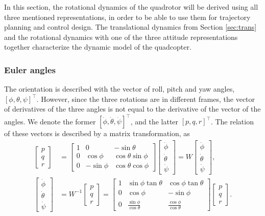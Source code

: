 In this section, the rotational dynamics of the quadrotor will be derived using all three mentioned representations, in order to be able to use them for trajectory planning and control design. The translational dynamics from Section \ref{sec:trans} and the rotational dynamics with one of the three attitude representations together characterize the dynamic model of the quadcopter.





\subsubsection{Euler angles}
The orientation is described with the vector of roll, pitch and yaw angles, $[\phi,\theta,\psi]^\top$. However, since the three rotations are in different frames, the vector of derivatives of the three angles is not equal to the derivative of the vector of the angles. We denote the former $[\dot\phi,\dot\theta,\dot\psi]^\top$, and the latter $[p,q,r]^\top$. The relation of these vectors is described by a matrix transformation, as
\begin{align}
\begin{bmatrix} p\\q\\ r \end{bmatrix} &= \begin{bmatrix}
1 & 0 & -\sin\theta \\ 
0 & \cos\phi & \cos\theta\sin\phi \\ 
0 & -\sin\phi & \cos\theta\cos\phi
\end{bmatrix}\begin{bmatrix}
\dot\phi \\ \dot\theta \\ \dot\psi
\end{bmatrix} = W \begin{bmatrix}
\dot\phi \\ \dot\theta \\ \dot\psi
\end{bmatrix},\\
\begin{bmatrix}
\dot\phi \\ \dot\theta \\ \dot\psi
\end{bmatrix}&= W^{-1}\begin{bmatrix} p\\q\\ r \end{bmatrix} = \begin{bmatrix}
1 & \sin\phi\tan\theta & \cos\phi\tan\theta \\
0 & \cos\phi & -\sin\phi \\
0 & \frac{\sin\phi}{\cos\theta} & \frac{\cos\phi}{\cos\theta}
\end{bmatrix}\begin{bmatrix} p\\q\\ r \end{bmatrix}.\label{eq:angvel}
\end{align}

